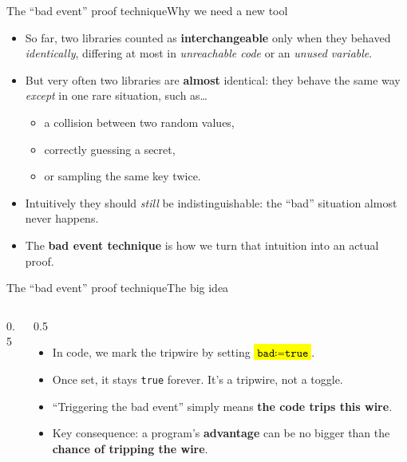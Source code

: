 \ifdefined\PRESENTATION\else\PassOptionsToClass{handout}{beamer}\fi\documentclass[aspectratio=169, lualatex]{beamer}
\begin{document}
\begin{frame}{The ``bad event'' proof technique}{Why we need a new tool}
	\begin{itemize}[<+->]
		\item So far, two libraries counted as \textbf{interchangeable} only when they behaved \textit{identically}, differing at most in \textit{unreachable code} or an \textit{unused variable}.
		\item But very often two libraries are \textbf{almost} identical: they behave the same way \textit{except} in one rare situation, such as\ldots
		      \begin{itemize}
			      \item a collision between two random values,
			      \item correctly guessing a secret,
			      \item or sampling the same key twice.
		      \end{itemize}
		\item Intuitively they should \textit{still} be indistinguishable: the ``bad'' situation almost never happens.
		\item The \textbf{bad event technique} is how we turn that intuition into an actual proof.
	\end{itemize}
\end{frame}

\begin{frame}{The ``bad event'' proof technique}{The big idea}
	\begin{columns}[c]
		\begin{column}{0.5\textwidth}
		\end{column}
		\begin{column}{0.5\textwidth}
			\begin{itemize}[<+->]
				\item In code, we mark the tripwire by setting \hl{$\texttt{bad} \coloneq \texttt{true}$}.
				\item Once set, it stays \texttt{true} forever. It's a tripwire, not a toggle.
				\item ``Triggering the bad event'' simply means \textbf{the code trips this wire}.
				\item Key consequence: a program's \textbf{advantage} can be no bigger than the \textbf{chance of tripping the wire}.
			\end{itemize}
		\end{column}
	\end{columns}
\end{frame}
\end{document}
